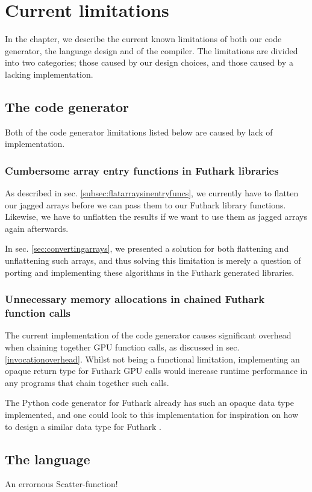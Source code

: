 \chapter{Current limitations}
In the chapter, we describe the current known limitations of both our code
generator, the \fshark{} language design and of the \fshark{} compiler. The
limitations are divided into two categories; those caused by our design choices,
and those caused by a lacking implementation.

\section{The \csharp{} code generator}
Both of the code generator limitations listed below are caused by lack of
implementation.

\subsection{Cumbersome array entry functions in Futhark libraries}
\label{cumbersomearrays}
As described in sec. \ref{subsec:flatarraysinentryfuncs}, we currently have to
flatten our jagged arrays before we can pass them to our Futhark library
functions. Likewise, we have to unflatten the results if we want to use them as
jagged arrays again afterwards.

In sec. \ref{sec:convertingarrays}, we presented a solution for both flattening
and unflattening such arrays, and thus solving this limitation is merely a
question of porting and implementing these algorithms in the Futhark generated
\csharp{} libraries.

\subsection{Unnecessary memory allocations in chained Futhark function calls}
The current implementation of the code generator causes significant overhead
when chaining together GPU function calls, as discussed in sec.
\ref{invocationoverhead}.
Whilst not being a functional limitation, implementing an
opaque return type for Futhark GPU calls would increase runtime
performance in any programs that chain together such calls.

The Python code generator for Futhark already has such an opaque data type
implemented, and one could look to this implementation for inspiration on how to
design a similar data type for Futhark \csharp{}.

\section{The \fshark{} language}
An errornous Scatter-function!

